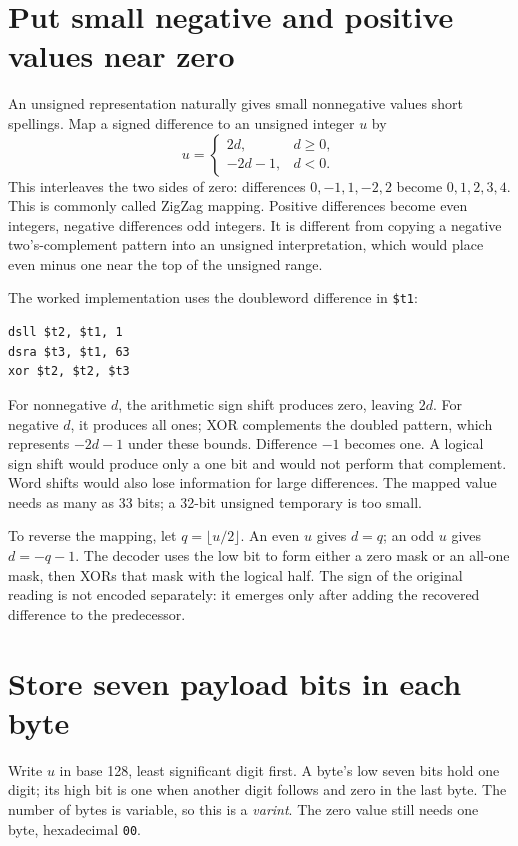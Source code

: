 \section{Put small negative and positive values near zero}

An unsigned representation naturally gives small nonnegative values short
spellings. Map a signed difference to an unsigned integer $u$ by
\[
  u=\begin{cases}2d,&d\geq0,\\-2d-1,&d<0.\end{cases}
\]
This interleaves the two sides of zero: differences $0,-1,1,-2,2$ become
$0,1,2,3,4$. This is commonly called ZigZag mapping. Positive differences become
even integers, negative differences odd integers. It is different from copying
a negative two's-complement pattern into an unsigned interpretation, which would
place even minus one near the top of the unsigned range.

The worked implementation uses the doubleword difference in \texttt{\$t1}:
\begin{verbatim}
dsll $t2, $t1, 1
dsra $t3, $t1, 63
xor $t2, $t2, $t3
\end{verbatim}

For nonnegative $d$, the arithmetic sign shift produces zero, leaving $2d$.
For negative $d$, it produces all ones; XOR complements the doubled pattern,
which represents $-2d-1$ under these bounds. Difference $-1$ becomes one.
A logical sign shift would produce only a one bit and would not perform that
complement. Word shifts would also lose information for large differences.
The mapped value needs as many as 33 bits; a 32-bit unsigned temporary is too small.

To reverse the mapping, let $q=\lfloor u/2\rfloor$. An even $u$ gives $d=q$;
an odd $u$ gives $d=-q-1$. The decoder uses the low bit to form either a zero
mask or an all-one mask, then XORs that mask with the logical half. The sign of
the original reading is not encoded separately: it emerges only after adding
the recovered difference to the predecessor.

\section{Store seven payload bits in each byte}

Write $u$ in base 128, least significant digit first. A byte's low seven bits
hold one digit; its high bit is one when another digit follows and zero in the
last byte. The number of bytes is variable, so this is a \emph{varint}. The
zero value still needs one byte, hexadecimal \texttt{00}.

